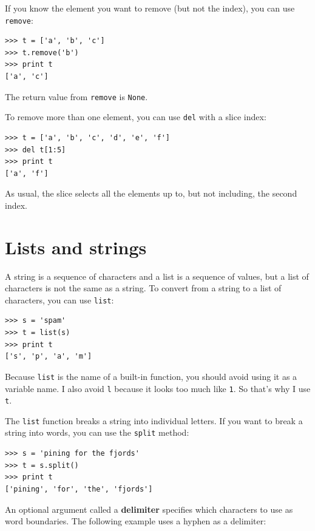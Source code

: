 \documentclass[10pt]{book}
\begin{document}
If you know the element you want to remove (but not the index), you
can use {\tt remove}:


\beforeverb
\begin{verbatim}
>>> t = ['a', 'b', 'c']
>>> t.remove('b')
>>> print t
['a', 'c']
\end{verbatim}
\afterverb
%
The return value from {\tt remove} is {\tt None}.


To remove more than one element, you can use {\tt del} with
a slice index:

\beforeverb
\begin{verbatim}
>>> t = ['a', 'b', 'c', 'd', 'e', 'f']
>>> del t[1:5]
>>> print t
['a', 'f']
\end{verbatim}
\afterverb
%
As usual, the slice selects all the elements up to, but not
including, the second index.


\section{Lists and strings}


A string is a sequence of characters and a list is a sequence
of values, but a list of characters is not the same as a
string.  To convert from a string to a list of characters,
you can use {\tt list}:


\beforeverb
\begin{verbatim}
>>> s = 'spam'
>>> t = list(s)
>>> print t
['s', 'p', 'a', 'm']
\end{verbatim}
\afterverb
%
Because {\tt list} is the name of a built-in function, you should
avoid using it as a variable name.  I also avoid {\tt l} because
it looks too much like {\tt 1}.  So that's why I use {\tt t}.

The {\tt list} function breaks a string into individual letters.  If
you want to break a string into words, you can use the {\tt split}
method:


\beforeverb
\begin{verbatim}
>>> s = 'pining for the fjords'
>>> t = s.split()
>>> print t
['pining', 'for', 'the', 'fjords']
\end{verbatim}
\afterverb
%
An optional argument called a {\bf delimiter} specifies which
characters to use as word boundaries.
The following example
uses a hyphen as a delimiter:
\end{document}
